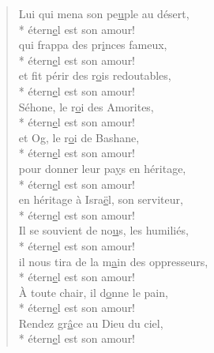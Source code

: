 \begin{verse}
Lui qui mena son pe\underline{u}ple au désert, \\*
étern\underline{e}l est son amour! \\
qui frappa des pr\underline{i}nces fameux, \\*
étern\underline{e}l est son amour! \\
et fit périr des r\underline{o}is redoutables, \\*
étern\underline{e}l est son amour! \\

Séhone, le r\underline{o}i des Amorites, \\*
étern\underline{e}l est son amour! \\
et Og, le r\underline{o}i de Bashane, \\*
étern\underline{e}l est son amour! \\

pour donner leur pa\underline{y}s en héritage, \\*
étern\underline{e}l est son amour! \\
en héritage à Isra\underline{ë}l, son serviteur, \\*
étern\underline{e}l est son amour! \\

Il se souvient de no\underline{u}s, les humiliés, \\*
étern\underline{e}l est son amour! \\
il nous tira de la m\underline{a}in des oppresseurs, \\*
étern\underline{e}l est son amour! \\

À toute chair, il d\underline{o}nne le pain, \\*
étern\underline{e}l est son amour! \\
Rendez gr\underline{â}ce au Dieu du ciel, \\*
étern\underline{e}l est son amour! \\
\end{verse}

